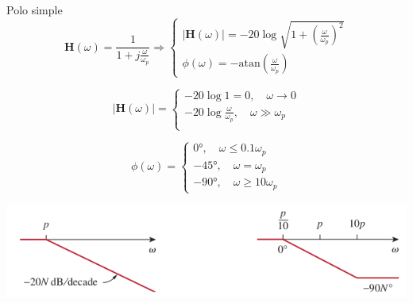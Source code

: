 \documentclass[xcolor={usenames,svgnames,dvipsnames}]{beamer}
\newcommand{\fasor}[1]{\mathbf{#1}(\omega)}
\newcommand{\atan}{\mathrm{atan}}
\begin{document}
\begin{frame}[label={sec:orgd8a55ea}]{Polo simple}
\[
  \fasor{H} = \frac{1}{1 + j\frac{\omega}{\omega_p}} \Rightarrow
  \begin{cases}
    |\fasor{H}| =  - 20 \log \sqrt{1 + \left(\frac{\omega}{\omega_p}\right)^2}\\
    \phi(\omega) = - \atan(\frac{\omega}{\omega_p}) 
  \end{cases}
\]

\[
  |\fasor{H}| = 
  \begin{cases}
  - 20 \log 1 = 0, \quad \omega \to 0\\
  - 20 \log \frac{\omega}{\omega_p}, \quad \omega \gg \omega_p\\
  \end{cases}
\]

\[
  \phi(\omega) = 
  \begin{cases}
    \ang{0},\quad \omega \leq 0.1\omega_p\\
    - \ang{45}, \quad \omega = \omega_p\\
    - \ang{90}, \quad \omega \geq 10 \omega_p
  \end{cases}
\]


\begin{center}
\includegraphics[width=.9\linewidth]{figs/BodePoloSimple.pdf}
\end{center}
\end{frame}
\end{document}
